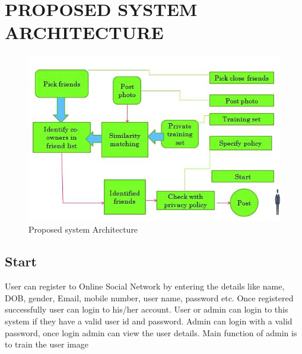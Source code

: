 \section[Proposed System Architecture]{\fontsize{14}{12}\selectfont PROPOSED SYSTEM ARCHITECTURE}
\begin{figure}[H]
\begin{minipage}{1\linewidth}
\centering
\begin{center}
 \includegraphics[width=\textwidth]{p.jpg}
            \caption[Proposed System Architecture]{Proposed system Architecture}
             \label{Invite friends}
\end{center}
\end{minipage}
\end{figure}
\subsection[Start]{Start}
User can register to Online Social Network by entering the details like name, DOB, gender, Email, mobile number, user name, password etc. Once registered successfully user can login to his/her account. User or admin can login to this system if they have a valid user id and password. Admin can login with a valid password, once login admin can view the user details. Main function of admin is to train the user image
